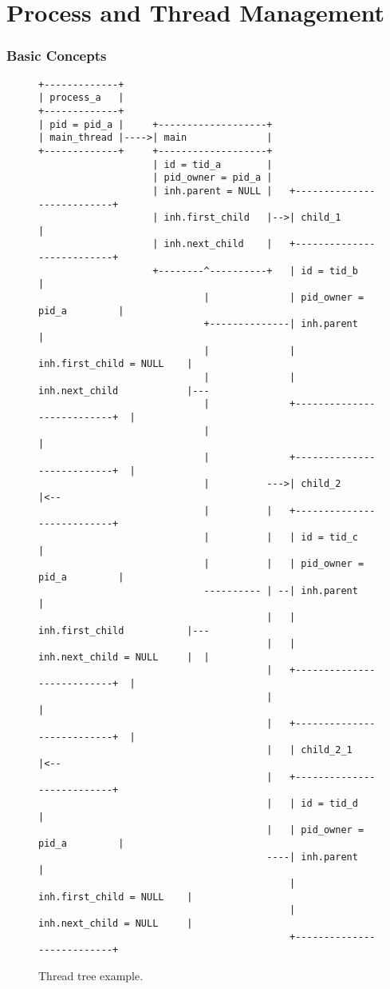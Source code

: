 \part{Process and Thread Management}

\section{Basic Concepts}

\begin{figure}
\begin{verbatim}
+-------------+
| process_a   |
+-------------+
| pid = pid_a |     +-------------------+
| main_thread |---->| main              |
+-------------+     +-------------------+
                    | id = tid_a        |
                    | pid_owner = pid_a |
                    | inh.parent = NULL |   +---------------------------+
                    | inh.first_child   |-->| child_1                   |
                    | inh.next_child    |   +---------------------------+
                    +--------^----------+   | id = tid_b                |
                             |              | pid_owner = pid_a         |
                             +--------------| inh.parent                |
                             |              | inh.first_child = NULL    |
                             |              | inh.next_child            |---
                             |              +---------------------------+  |
                             |                                             |
                             |              +---------------------------+  |
                             |          --->| child_2                   |<--
                             |          |   +---------------------------+
                             |          |   | id = tid_c                |
                             |          |   | pid_owner = pid_a         |
                             ---------- | --| inh.parent                |
                                        |   | inh.first_child           |---
                                        |   | inh.next_child = NULL     |  |
                                        |   +---------------------------+  |
                                        |                                  |
                                        |   +---------------------------+  |
                                        |   | child_2_1                 |<--
                                        |   +---------------------------+
                                        |   | id = tid_d                |
                                        |   | pid_owner = pid_a         |
                                        ----| inh.parent                |
                                            | inh.first_child = NULL    |
                                            | inh.next_child = NULL     |
                                            +---------------------------+
\end{verbatim}
\caption{Thread tree example.}
\label{figure:thtree}
\end{figure}

